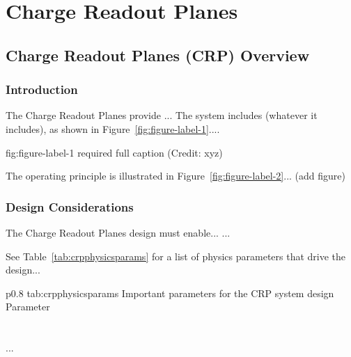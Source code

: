 \chapter{Charge Readout Planes}
\label{ch:fddp-CRP}

\section{Charge Readout Planes (CRP) Overview}
\label{sec:fddp-crp-ov}


\subsection{Introduction}
\label{sec:fddp-crp-intro}

The Charge Readout Planes provide ...
The system includes (whatever it includes), as shown in Figure~\ref{fig:figure-label-1}.... 


\begin{dunefigure}{fig:figure-label-1}
{required full caption (Credit: xyz)}
\end{dunefigure}

The operating principle is illustrated in Figure~\ref{fig:figure-label-2}... (add figure)


\subsection{Design Considerations}
\label{sec:fddp-crp-des-consid}


The Charge Readout Planes design must enable... 
...


See Table~\ref{tab:crpphysicsparams} for a list of physics parameters that drive the design...

\begin{dunetable}
{p{0.8\textwidth}}
{tab:crpphysicsparams}
{Important parameters for the CRP system design}   
Parameter \\ \toprowrule
  \\ \colhline
   \\ \colhline
 ...\\ 
\end{dunetable}

